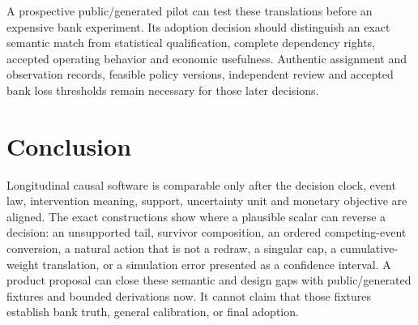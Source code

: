 A prospective public/generated pilot can test these translations before an
expensive bank experiment. Its adoption decision should distinguish an exact
semantic match from statistical qualification, complete dependency rights,
accepted operating behavior and economic usefulness. Authentic assignment and
observation records, feasible policy versions, independent review and accepted
bank loss thresholds remain necessary for those later decisions.
\citep{exec17_s5_design}



\section{Conclusion}
\label{exec17:s5-end}

Longitudinal causal software is comparable only after the decision clock,
event law, intervention meaning, support, uncertainty unit and monetary
objective are aligned. The exact constructions show where a plausible scalar
can reverse a decision: an unsupported tail, survivor composition, an ordered
competing-event conversion, a natural action that is not a redraw, a singular
cap, a cumulative-weight translation, or a simulation error presented as a
confidence interval. A product proposal can close these semantic and design
gaps with public/generated fixtures and bounded derivations now. It cannot
claim that those fixtures establish bank truth, general calibration, or final
adoption.
